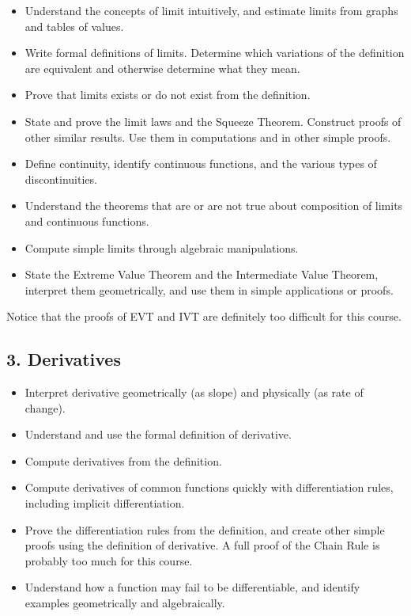 \documentclass[11pt]{article}
\begin{document}
	\begin{itemize}
		\item Understand the concepts of limit intuitively, and estimate limits from
			graphs and tables of values.

		\item Write formal definitions of limits. Determine which variations of the
			definition are equivalent and otherwise determine what they mean.

		\item Prove that limits exists or do not exist from the definition.

		\item State and prove the limit laws and the Squeeze Theorem. Construct
			proofs of other similar results. Use them in computations and in other simple
			proofs.

		\item Define continuity, identify continuous functions, and the various types
			of discontinuities.

		\item Understand the theorems that are or are not true about composition of limits
			and continuous functions.

		\item Compute simple limits through algebraic manipulations.

		\item State the Extreme Value Theorem and the Intermediate Value Theorem,
			interpret them geometrically, and use them in simple applications or proofs.
	\end{itemize}

	Notice that the proofs of EVT and IVT are definitely too difficult for this course.

	\subsection{3. Derivatives}

	\begin{itemize}
		\item Interpret derivative geometrically (as slope) and physically (as rate
			of change).

		\item Understand and use the formal definition of derivative.

		\item Compute derivatives from the definition.

		\item Compute derivatives of common functions quickly with differentiation rules,
			including implicit differentiation.

		\item Prove the differentiation rules from the definition, and create other
			simple proofs using the definition of derivative. A full proof of the Chain
			Rule is probably too much for this course.

		\item Understand how a function may fail to be differentiable, and identify
			examples geometrically and algebraically.
	\end{itemize}
\end{document}
